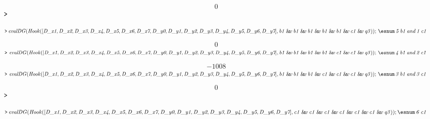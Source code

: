 \documentclass{article}
\begin{document}
\begin{dmath}\label{(46)}
0
\end{dmath}
\mapleinput
{$ \displaystyle \texttt{>\,} \, $}

\mapleinput
{$ \displaystyle \texttt{>\,} \mathit{evalDG} (\mathit{Hook} ([\textit{D\_x1} ,\textit{D\_x2} ,\textit{D\_x3} ,\textit{D\_x4} ,\textit{D\_x5} ,\textit{D\_x6} ,\textit{D\_x7} ,\textit{D\_y0} ,\textit{D\_y1} ,\textit{D\_y2} ,\textit{D\_y3} ,\textit{D\_y4} ,\textit{D\_y5} ,\textit{D\_y6} ,\textit{D\_y7}],\mathit{b1} \:\&\!\!w \,\mathit{b1} \:\&\!\!w \,\mathit{b1} \:\&\!\!w \,\mathit{b1} \:\&\!\!w \,\mathit{b1} \:\&\!\!w \,\mathit{c1} \:\&\!\!w \,\mathit{q3}));\,\esnum \mathit{\,5\,b1\,and\,1\,c1\,}  $}

\begin{dmath}\label{(47)}
0
\end{dmath}
\mapleinput
{$ \displaystyle \texttt{>\,} \,\mathit{evalDG} (\mathit{Hook} ([\textit{D\_x1} ,\textit{D\_x2} ,\textit{D\_x3} ,\textit{D\_x4} ,\textit{D\_x5} ,\textit{D\_x6} ,\textit{D\_x7} ,\textit{D\_y0} ,\textit{D\_y1} ,\textit{D\_y2} ,\textit{D\_y3} ,\textit{D\_y4} ,\textit{D\_y5} ,\textit{D\_y6} ,\textit{D\_y7}],\mathit{b1} \:\&\!\!w \,\mathit{b1} \:\&\!\!w \,\mathit{b1} \:\&\!\!w \,\mathit{b1} \:\&\!\!w \,\mathit{c1} \:\&\!\!w \,\mathit{c1} \:\&\!\!w \,\mathit{q3}));\,\esnum \mathit{\,4\,b1\,and\,2\,c1\,}  $}

\begin{dmath}\label{(48)}
-1008
\end{dmath}
\mapleinput
{$ \displaystyle \texttt{>\,} \,\mathit{evalDG} (\mathit{Hook} ([\textit{D\_x1} ,\textit{D\_x2} ,\textit{D\_x3} ,\textit{D\_x4} ,\textit{D\_x5} ,\textit{D\_x6} ,\textit{D\_x7} ,\textit{D\_y0} ,\textit{D\_y1} ,\textit{D\_y2} ,\textit{D\_y3} ,\textit{D\_y4} ,\textit{D\_y5} ,\textit{D\_y6} ,\textit{D\_y7}],\mathit{b1} \:\&\!\!w \,\mathit{b1} \:\&\!\!w \,\mathit{b1} \:\&\!\!w \,\mathit{c1} \:\&\!\!w \,\mathit{c1} \:\&\!\!w \,\mathit{c1} \:\&\!\!w \,\mathit{q3}));\,\esnum \mathit{\,3\,b1\,and\,3\,c1\,}  $}

\begin{dmath}\label{(49)}
0
\end{dmath}
\mapleinput
{$ \displaystyle \texttt{>\,} \, $}

\mapleinput
{$ \displaystyle \texttt{>\,} \mathit{evalDG} (\mathit{Hook} ([\textit{D\_x1} ,\textit{D\_x2} ,\textit{D\_x3} ,\textit{D\_x4} ,\textit{D\_x5} ,\textit{D\_x6} ,\textit{D\_x7} ,\textit{D\_y0} ,\textit{D\_y1} ,\textit{D\_y2} ,\textit{D\_y3} ,\textit{D\_y4} ,\textit{D\_y5} ,\textit{D\_y6} ,\textit{D\_y7}],\mathit{c1} \:\&\!\!w \,\mathit{c1} \:\&\!\!w \,\mathit{c1} \:\&\!\!w \,\mathit{c1} \:\&\!\!w \,\mathit{c1} \:\&\!\!w \,\mathit{c1} \:\&\!\!w \,\mathit{q3}));\esnum \mathit{\,6\,c1\,}  $}
\end{document}
